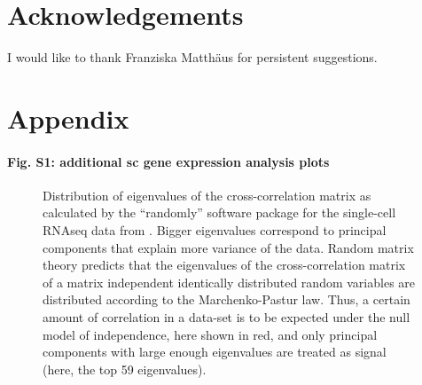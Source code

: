 \documentclass[review]{elsarticle}
\begin{document}
\section*{Acknowledgements} I would like to thank Franziska Matth\"aus for persistent suggestions.
\section*{Appendix}
\renewcommand{\thefigure}{S\arabic{figure}}
\setcounter{figure}{0}
\renewcommand{\thesection}{S}
\paragraph{Fig. S1: additional sc gene expression analysis plots}
\begin{figure}
\centering
{}
\caption{Distribution of eigenvalues of the cross-correlation matrix as calculated by the ``randomly'' software package \cite{Aparicio2018} for the single-cell RNAseq data from \cite{Morrison2018}. Bigger eigenvalues correspond to principal components that explain more variance of the data. Random matrix theory predicts that the eigenvalues of the cross-correlation matrix of a matrix independent identically distributed random variables are distributed according to the Marchenko-Pastur law. Thus, a certain amount of correlation in a data-set is to be expected under the null model of independence, here shown in red, and only principal components with large enough eigenvalues are treated as signal (here, the top 59 eigenvalues). \label{figMP}}
\end{figure}
\end{document}
